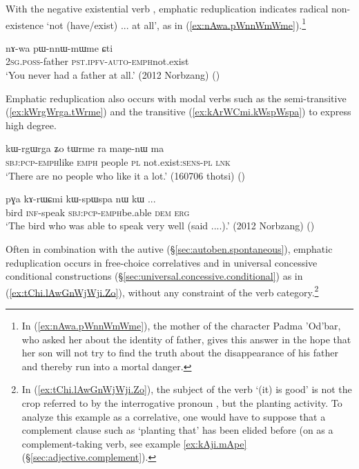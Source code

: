 With the negative existential verb , emphatic reduplication indicates radical non-existence `not (have/exist) ... at all', as in (\ref{ex:nAwa.pWnnWmWme}).\footnote{In (\ref{ex:nAwa.pWnnWmWme}), the mother of the character Padma 'Od'bar, who asked her about the identity of  father, gives this answer in the hope that her son will not try to find the truth about the disappearance of his father and thereby run into a mortal danger. }

\begin{exe}
\ex \label{ex:nAwa.pWnnWmWme}
\gll nɤ-wa pɯ-nnɯ-mɯ\redp{}me ɕti \\
 \textsc{2sg}.\textsc{poss}-father \textsc{pst}.\textsc{ipfv}-\textsc{auto}-\textsc{emph}\redp{}not.exist \\
\glt `You never had a father at all.' (2012 Norbzang) 	()
\end{exe}

Emphatic reduplication also occurs with modal verbs such as the semi-transitive   (\ref{ex:kWrgWrga.tWrme}) and the transitive  (\ref{ex:kArWCmi.kWspWspa}) to express high degree.

\begin{exe}
\ex \label{ex:kWrgWrga.tWrme}
\gll  kɯ-rgɯ\redp{}rga ʑo tɯrme ra maŋe-nɯ ma  \\
\textsc{sbj}:\textsc{pcp}-\textsc{emph}\redp{}like \textsc{emph} people \textsc{pl} not.exist:\textsc{sens}-\textsc{pl} \textsc{lnk} \\
\glt `There are no people who like it a lot.' (160706 thotsi) ()
\end{exe}

\begin{exe}
\ex \label{ex:kArWCmi.kWspWspa}
\gll pɣa kɤ-rɯɕmi kɯ-spɯ\redp{}spa nɯ kɯ ... \\
bird \textsc{inf}-speak \textsc{sbj}:\textsc{pcp}-\textsc{emph}\redp{}be.able \textsc{dem} \textsc{erg} \\
\glt `The bird who was able to speak very well (said ....).' (2012 Norbzang) ()
\end{exe}

Often in combination with the autive  (§\ref{sec:autoben.spontaneous}), emphatic reduplication occurs in free-choice correlatives and in universal concessive conditional constructions (§\ref{sec:universal.concessive.conditional}) as in (\ref{ex:tChi.lAwGnWjWji.Zo}), without any constraint of the verb category.\footnote{In (\ref{ex:tChi.lAwGnWjWji.Zo}), the subject of the verb  `(it) is good' is not the crop referred to by the interrogative pronoun , but the planting activity. To analyze this example as a correlative, one would have to suppose that a complement clause such as  `planting that' has been elided before  (on  as a com\-ple\-ment-taking verb, see example \ref{ex:kAji.mApe} (§\ref{sec:adjective.complement}).  }

